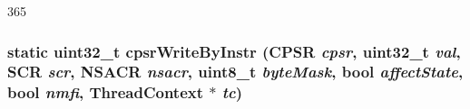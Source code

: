 \begin{DoxyCode}
365 {}
\end{DoxyCode}
\hypertarget{classArmISA_1_1ArmStaticInst_a26cbe697c83efb76534cf501020a9e8c}{
\subsubsection[{cpsrWriteByInstr}]{\setlength{\rightskip}{0pt plus 5cm}static {\bf uint32\_\-t} cpsrWriteByInstr (CPSR {\em cpsr}, \/  {\bf uint32\_\-t} {\em val}, \/  SCR {\em scr}, \/  NSACR {\em nsacr}, \/  uint8\_\-t {\em byteMask}, \/  bool {\em affectState}, \/  bool {\em nmfi}, \/  {\bf ThreadContext} $\ast$ {\em tc})}}
\label{classArmISA_1_1ArmStaticInst_a26cbe697c83efb76534cf501020a9e8c}



